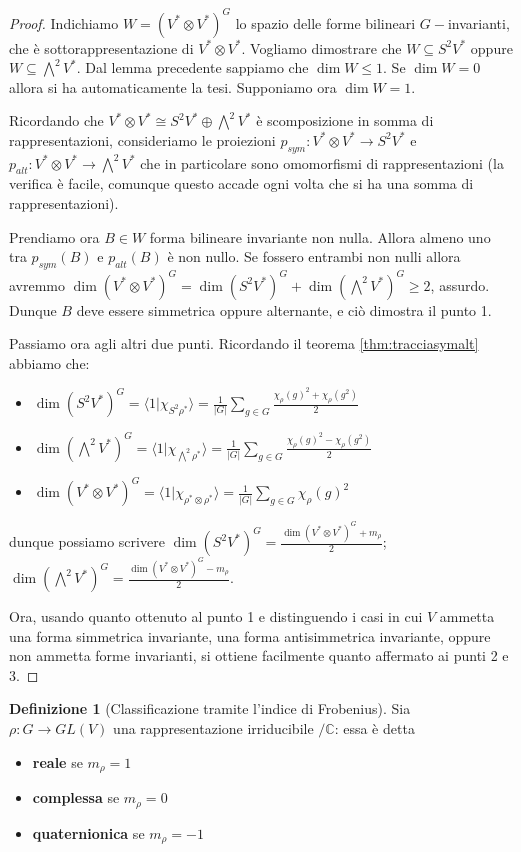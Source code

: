 \documentclass[11pt]{article}
\theoremstyle{plain}
\theoremstyle{definition}
\newtheorem{defn}{Definizione}[section]
\theoremstyle{remark}
\newcommand{\C}{\mathbb{C}}
\newcommand{\dsum}{\displaystyle\sum}
\begin{document}
\begin{proof}
Indichiamo $W = (V^*\otimes V^*)^G$ lo spazio delle forme bilineari $G-$invarianti, che è sottorappresentazione di $V^*\otimes V^*$.
Vogliamo dimostrare che $W\subseteq S^2V^*$ oppure $W\subseteq \bigwedge^2V^*$.
Dal lemma precedente sappiamo che $\dim W \le 1$. Se $\dim W = 0$ allora si ha automaticamente la tesi.
Supponiamo ora $\dim W = 1$.

Ricordando che $V^*\otimes V^* \cong S^2V^* \oplus \bigwedge^2V^*$ è scomposizione in somma di rappresentazioni,
consideriamo le proiezioni $p_{sym}:V^*\otimes V^* \to S^2V^*$ e $p_{alt}:V^*\otimes V^* \to \bigwedge^2V^*$
che in particolare sono omomorfismi di rappresentazioni (la verifica è facile, comunque questo accade ogni volta che si ha una somma di rappresentazioni).

Prendiamo ora $B\in W$ forma bilineare invariante non nulla. Allora almeno uno tra $p_{sym}(B)$ e $p_{alt}(B)$ è non nullo. Se fossero entrambi non nulli allora avremmo $\dim (V^*\otimes V^*)^G = \dim(S^2V^*)^G + \dim(\bigwedge^2V^*)^G \ge 2$, assurdo.
Dunque $B$ deve essere simmetrica oppure alternante, e ciò dimostra il punto 1.

Passiamo ora agli altri due punti. Ricordando il teorema \ref{thm:tracciasymalt} abbiamo che:
\begin{itemize}
\item $\dim(S^2V^*)^G = \langle 1|\chi_{S^2\rho^*}\rangle = \frac{1}{|G|}\dsum_{g\in G}\frac{\chi_\rho(g)^2 + \chi_\rho(g^2)}{2}$
\item $\dim(\bigwedge^2V^*)^G = \langle 1|\chi_{\bigwedge^2\rho^*}\rangle = \frac{1}{|G|}\dsum_{g\in G}\frac{\chi_\rho(g)^2 - \chi_\rho(g^2)}{2}$
\item $\dim(V^*\otimes V^*)^G = \langle 1|\chi_{\rho^*\otimes\rho^*}\rangle = \frac{1}{|G|}\dsum_{g\in G}\chi_\rho(g)^2$
\end{itemize}
dunque possiamo scrivere
$\dim(S^2V^*)^G = \frac{\dim(V^*\otimes V^*)^G + m_\rho}{2}$;\ \ 
$\dim(\bigwedge^2V^*)^G = \frac{\dim(V^*\otimes V^*)^G - m_\rho}{2}$.

Ora, usando quanto ottenuto al punto 1 e distinguendo i casi in cui $V$ ammetta una forma simmetrica invariante, una forma antisimmetrica invariante, oppure non ammetta forme invarianti, si ottiene facilmente quanto affermato ai punti 2 e 3.
\end{proof}

\begin{defn}[Classificazione tramite l'indice di Frobenius]
Sia $\rho:G\rightarrow GL(V)$ una rappresentazione irriducibile $/\C$: essa è detta
\begin{itemize}
\item \textbf{reale} se $m_\rho = 1$  
\item \textbf{complessa} se $m_\rho = 0$ 
\item \textbf{quaternionica} se $m_\rho = -1$
\end{itemize}
\end{defn}
\end{document}
